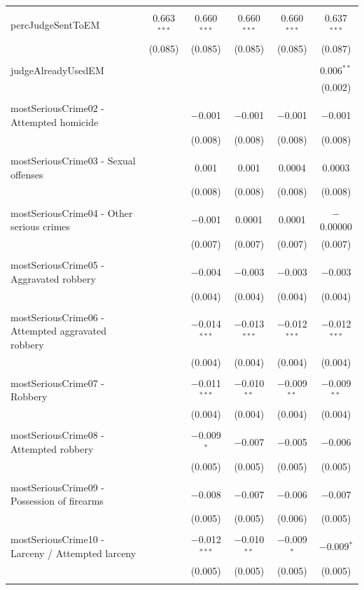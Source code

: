 \documentclass[a4paper,12pt]{article}
\begin{document}
\begin{table}[!htbp]
{\begin{tabular}{@{\extracolsep{5pt}}lccccc}
\hline \\[-1.8ex] 
 percJudgeSentToEM & 0.663$^{***}$ & 0.660$^{***}$ & 0.660$^{***}$ & 0.660$^{***}$ & 0.637$^{***}$ \\ 
  & (0.085) & (0.085) & (0.085) & (0.085) & (0.087) \\ 
  & & & & & \\ 
 judgeAlreadyUsedEM &  &  &  &  & 0.006$^{**}$ \\ 
  &  &  &  &  & (0.002) \\ 
  & & & & & \\ 
 mostSeriousCrime02 - Attempted homicide &  & $-$0.001 & $-$0.001 & $-$0.001 & $-$0.001 \\ 
  &  & (0.008) & (0.008) & (0.008) & (0.008) \\ 
  & & & & & \\ 
 mostSeriousCrime03 - Sexual offenses &  & 0.001 & 0.001 & 0.0004 & 0.0003 \\ 
  &  & (0.008) & (0.008) & (0.008) & (0.008) \\ 
  & & & & & \\ 
 mostSeriousCrime04 - Other serious crimes &  & $-$0.001 & 0.0001 & 0.0001 & $-$0.00000 \\ 
  &  & (0.007) & (0.007) & (0.007) & (0.007) \\ 
  & & & & & \\ 
 mostSeriousCrime05 - Aggravated robbery &  & $-$0.004 & $-$0.003 & $-$0.003 & $-$0.003 \\ 
  &  & (0.004) & (0.004) & (0.004) & (0.004) \\ 
  & & & & & \\ 
 mostSeriousCrime06 - Attempted aggravated robbery &  & $-$0.014$^{***}$ & $-$0.013$^{***}$ & $-$0.012$^{***}$ & $-$0.012$^{***}$ \\ 
  &  & (0.004) & (0.004) & (0.004) & (0.004) \\ 
  & & & & & \\ 
 mostSeriousCrime07 - Robbery &  & $-$0.011$^{***}$ & $-$0.010$^{**}$ & $-$0.009$^{**}$ & $-$0.009$^{**}$ \\ 
  &  & (0.004) & (0.004) & (0.004) & (0.004) \\ 
  & & & & & \\ 
 mostSeriousCrime08 - Attempted robbery &  & $-$0.009$^{*}$ & $-$0.007 & $-$0.005 & $-$0.006 \\ 
  &  & (0.005) & (0.005) & (0.005) & (0.005) \\ 
  & & & & & \\ 
 mostSeriousCrime09 - Possession of firearms &  & $-$0.008 & $-$0.007 & $-$0.006 & $-$0.007 \\ 
  &  & (0.005) & (0.005) & (0.006) & (0.005) \\ 
  & & & & & \\ 
 mostSeriousCrime10 - Larceny / Attempted larceny &  & $-$0.012$^{***}$ & $-$0.010$^{**}$ & $-$0.009$^{*}$ & $-$0.009$^{*}$ \\ 
  &  & (0.005) & (0.005) & (0.005) & (0.005) \\ 
  & & & & & \\ 
  

\end{tabular}}
\end{table}
\end{document}
